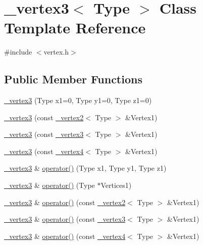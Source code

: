 \hypertarget{class__vertex3}{\section{\+\_\+vertex3$<$ Type $>$ Class Template Reference}
\label{class__vertex3}
}


{\ttfamily \#include $<$vertex.\+h$>$}

\subsection*{Public Member Functions}
\begin{DoxyCompactItemize}
\item 
\hyperlink{class__vertex3_a339d27aa153a3206f527adb90880f11a}{\+\_\+vertex3} (Type x1=0, Type y1=0, Type z1=0)
\item 
\hyperlink{class__vertex3_a74d1cbcb5614c5a621244ab751ae26ab}{\+\_\+vertex3} (const \hyperlink{class__vertex2}{\+\_\+vertex2}$<$ Type $>$ \&Vertex1)
\item 
\hyperlink{class__vertex3_a2d923cf5bb23c27221437f2f5f76a1a3}{\+\_\+vertex3} (const \hyperlink{class__vertex3}{\+\_\+vertex3}$<$ Type $>$ \&Vertex1)
\item 
\hyperlink{class__vertex3_a889d6e6e8aa3a5ec4e84f7cac6499010}{\+\_\+vertex3} (const \hyperlink{class__vertex4}{\+\_\+vertex4}$<$ Type $>$ \&Vertex1)
\item 
\hyperlink{class__vertex3}{\+\_\+vertex3} \& \hyperlink{class__vertex3_a3477543dc09f967a3768b053c89035c2}{operator()} (Type x1, Type y1, Type z1)
\item 
\hyperlink{class__vertex3}{\+\_\+vertex3} \& \hyperlink{class__vertex3_afd35dc48ead9c7be3ab5c63d399dcca2}{operator()} (Type $\ast$Vertices1)
\item 
\hyperlink{class__vertex3}{\+\_\+vertex3} \& \hyperlink{class__vertex3_a8b32939d21b873a93b8ecdd995e6ea84}{operator()} (const \hyperlink{class__vertex2}{\+\_\+vertex2}$<$ Type $>$ \&Vertex1)
\item 
\hyperlink{class__vertex3}{\+\_\+vertex3} \& \hyperlink{class__vertex3_a83e90f2ac4062e0f76c7a30a8f16b86f}{operator()} (const \hyperlink{class__vertex3}{\+\_\+vertex3}$<$ Type $>$ \&Vertex1)
\item 
\hyperlink{class__vertex3}{\+\_\+vertex3} \& \hyperlink{class__vertex3_ae3df037720fde95abafd0238ea89111d}{operator()} (const \hyperlink{class__vertex4}{\+\_\+vertex4}$<$ Type $>$ \&Vertex1)
\item 

\end{DoxyCompactItemize}
